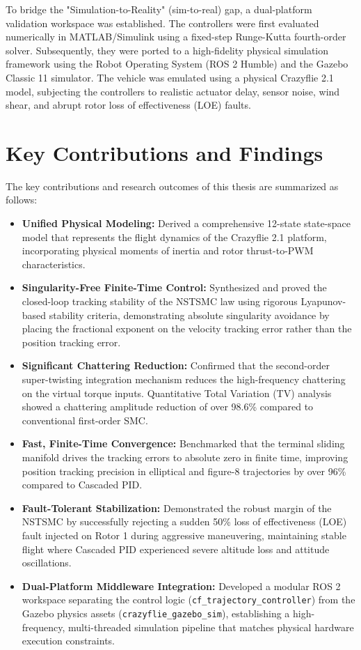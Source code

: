 To bridge the "Simulation-to-Reality" (sim-to-real) gap, a dual-platform validation workspace was established. The controllers were first evaluated numerically in MATLAB/Simulink using a fixed-step Runge-Kutta fourth-order solver. Subsequently, they were ported to a high-fidelity physical simulation framework using the Robot Operating System (ROS 2 Humble) and the Gazebo Classic 11 simulator. The vehicle was emulated using a physical Crazyflie 2.1 model, subjecting the controllers to realistic actuator delay, sensor noise, wind shear, and abrupt rotor loss of effectiveness (LOE) faults.

\section{Key Contributions and Findings}
The key contributions and research outcomes of this thesis are summarized as follows:
\begin{itemize}
    \item \textbf{Unified Physical Modeling:} Derived a comprehensive 12-state state-space model that represents the flight dynamics of the Crazyflie 2.1 platform, incorporating physical moments of inertia and rotor thrust-to-PWM characteristics.
    \item \textbf{Singularity-Free Finite-Time Control:} Synthesized and proved the closed-loop tracking stability of the NSTSMC law using rigorous Lyapunov-based stability criteria, demonstrating absolute singularity avoidance by placing the fractional exponent on the velocity tracking error rather than the position tracking error.
    \item \textbf{Significant Chattering Reduction:} Confirmed that the second-order super-twisting integration mechanism reduces the high-frequency chattering on the virtual torque inputs. Quantitative Total Variation (TV) analysis showed a chattering amplitude reduction of over 98.6\% compared to conventional first-order SMC.
    \item \textbf{Fast, Finite-Time Convergence:} Benchmarked that the terminal sliding manifold drives the tracking errors to absolute zero in finite time, improving position tracking precision in elliptical and figure-8 trajectories by over 96\% compared to Cascaded PID.
    \item \textbf{Fault-Tolerant Stabilization:} Demonstrated the robust margin of the NSTSMC by successfully rejecting a sudden 50\% loss of effectiveness (LOE) fault injected on Rotor 1 during aggressive maneuvering, maintaining stable flight where Cascaded PID experienced severe altitude loss and attitude oscillations.
    \item \textbf{Dual-Platform Middleware Integration:} Developed a modular ROS 2 workspace separating the control logic (\texttt{cf\_trajectory\_controller}) from the Gazebo physics assets (\texttt{crazyflie\_gazebo\_sim}), establishing a high-frequency, multi-threaded simulation pipeline that matches physical hardware execution constraints.
\end{itemize}

